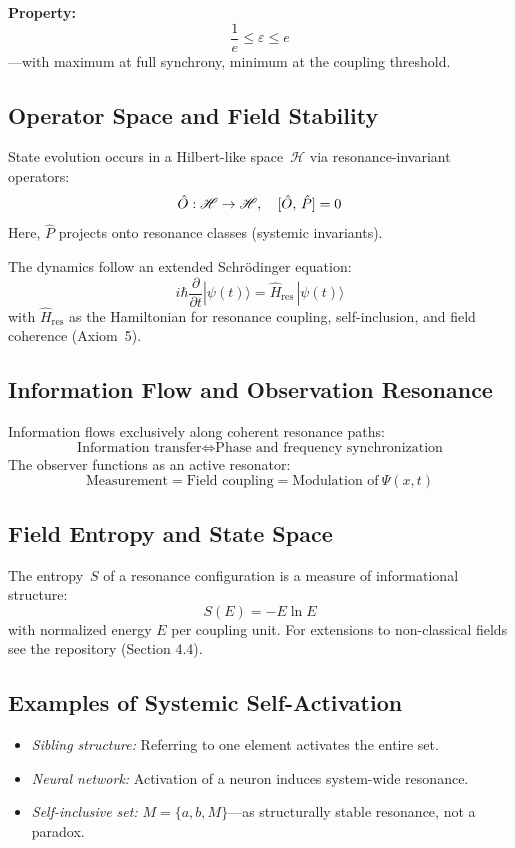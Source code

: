 \documentclass[12pt]{iopart}
\providecommand{\mathcal}[1]{\mathscr{#1}}
\providecommand{\text}[1]{\mbox{#1}}
\providecommand{\quad}{\hskip1em\relax}
\begin{document}
\textbf{Property:}
\[
\frac{1}{e} \leq \varepsilon \leq e
\]
—with maximum at full synchrony, minimum at the coupling threshold.

\subsection{Operator Space and Field Stability}

State evolution occurs in a Hilbert-like space~$\mathcal{H}$ via resonance-invariant operators:
\[
\hat{O} : \mathcal{H} \to \mathcal{H},\quad [\hat{O},\,\hat{P}] = 0
\]
Here, $\hat{P}$ projects onto resonance classes (systemic invariants).

The dynamics follow an extended Schrödinger equation:
\[
i\hbar \frac{\partial}{\partial t} |\psi(t)\rangle = \hat{H}_{\text{res}}\, |\psi(t)\rangle
\]
with $\hat{H}_{\text{res}}$ as the Hamiltonian for resonance coupling, self-inclusion, and field coherence (Axiom~5).

\subsection{Information Flow and Observation Resonance}

Information flows exclusively along coherent resonance paths:
\[
\text{Information transfer} \iff \text{Phase and frequency synchronization}
\]
The observer functions as an active resonator:
\[
\text{Measurement} = \text{Field coupling} = \text{Modulation of}~\Psi(x, t)
\]

\subsection{Field Entropy and State Space}

The entropy~$S$ of a resonance configuration is a measure of informational structure:
\[
S(E) = -E \ln E
\]
with normalized energy $E$ per coupling unit. For extensions to non-classical fields see the repository (Section 4.4).

\subsection{Examples of Systemic Self-Activation}

\begin{itemize}
	\item \textit{Sibling structure:} Referring to one element activates the entire set.
	\item \textit{Neural network:} Activation of a neuron induces system-wide resonance.
	\item \textit{Self-inclusive set:} $M = \{a, b, M\}$—as structurally stable resonance, not a paradox.
\end{itemize}
\end{document}
